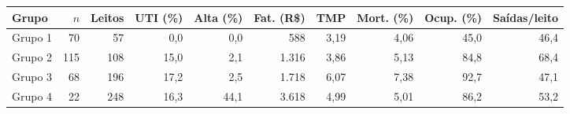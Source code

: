\begin{tabular}{lrrrrrrrrr}
\toprule
Grupo & $n$ & Leitos & UTI (\%) & Alta (\%) & Fat. (R\$) & TMP & Mort. (\%) & Ocup. (\%) & Saídas/leito \\
\midrule
Grupo 1 & 70 & 57 & 0,0 & 0,0 & 588 & 3,19 & 4,06 & 45,0 & 46,4 \\
Grupo 2 & 115 & 108 & 15,0 & 2,1 & 1.316 & 3,86 & 5,13 & 84,8 & 68,4 \\
Grupo 3 & 68 & 196 & 17,2 & 2,5 & 1.718 & 6,07 & 7,38 & 92,7 & 47,1 \\
Grupo 4 & 22 & 248 & 16,3 & 44,1 & 3.618 & 4,99 & 5,01 & 86,2 & 53,2 \\
\bottomrule
\end{tabular}
